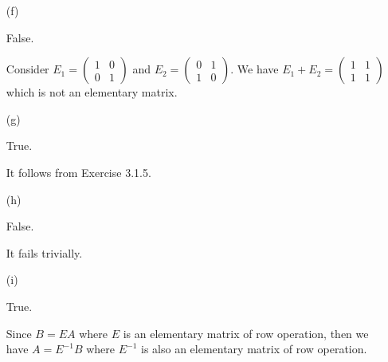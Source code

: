 \begin{Exercise}
\begin{enumerate}[(a)]
\item[(f)]
\begin{answer}
False.
\end{answer}
\begin{solution}
Consider $E_1 = \begin{pmatrix}
1 & 0 \\
0 & 1
\end{pmatrix}$ and $E_2 = \begin{pmatrix}
0 & 1 \\
1 & 0
\end{pmatrix}$. We have $E_1 + E_2 = \begin{pmatrix}
1 & 1 \\
1 & 1
\end{pmatrix}$ which is not an elementary matrix.
\end{solution}

\item[(g)]
\begin{answer}
True.
\end{answer}
\begin{solution}
It follows from Exercise 3.1.5.
\end{solution}

\item[(h)]
\begin{answer}
False.
\end{answer}
\begin{solution}
It fails trivially.
\end{solution}

\item[(i)]
\begin{answer}
True.
\end{answer}
\begin{solution}
Since $B=EA$ where $E$ is an elementary matrix of row operation, then we have $A = E^{-1}B$ where $E^{-1}$ is also an elementary matrix of row operation.
\end{solution}

\end{enumerate}
\end{Exercise}